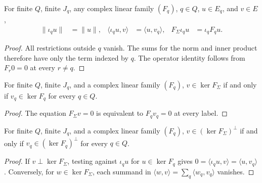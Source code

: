 \begin{lemma}
    \label{thm:mpo_single_sigma_fiber_identities}
    \leanok
    For finite $Q$, finite $J_q$, any complex linear family $(F_q)$,
    $q\in Q$, $u\in E_q$, and $v\in E$,
    \begin{align}
        \|\iota_qu\|             & =\|u\|,                &
        \langle\iota_qu,v\rangle & =\langle u,v_q\rangle, &
        F_\Sigma\iota_qu         & =\iota_qF_qu.
    \end{align}
\end{lemma}
\begin{proof}
    \leanok
    All restrictions outside $q$ vanish.  The sums for the norm and inner
    product therefore have only the term indexed by $q$.  The operator
    identity follows from $F_r0=0$ at every $r\ne q$.
\end{proof}

\begin{lemma}
    \label{thm:mpo_sigma_fiber_kernel}
    \leanok
    For finite $Q$, finite $J_q$, and a complex linear family $(F_q)$,
    $v\in\ker F_\Sigma$ if and only if $v_q\in\ker F_q$ for every $q\in Q$.
\end{lemma}
\begin{proof}
    \leanok
    The equation $F_\Sigma v=0$ is equivalent to $F_qv_q=0$ at every label.
\end{proof}

\begin{lemma}
    \label{thm:mpo_sigma_fiber_orthogonal}
    \leanok
    For finite $Q$, finite $J_q$, and a complex linear family $(F_q)$,
    $v\in(\ker F_\Sigma)^\perp$ if and only if
    $v_q\in(\ker F_q)^\perp$ for every $q\in Q$.
\end{lemma}
\begin{proof}
    \leanok
    If $v\perp\ker F_\Sigma$, testing against $\iota_qu$ for $u\in\ker F_q$
    gives $0=\langle\iota_qu,v\rangle=\langle u,v_q\rangle$.
    Conversely, for $w\in\ker F_\Sigma$, each summand in
    $\langle w,v\rangle=\sum_q\langle w_q,v_q\rangle$ vanishes.
\end{proof}

